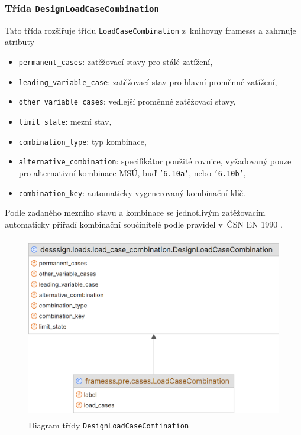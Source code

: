 \subsubsection*{Třída \texttt{DesignLoadCaseCombination}}
Tato třída rozšiřuje třídu \texttt{LoadCaseCombination} z~knihovny framesss a zahrnuje atributy
\begin{itemize}
    \item \texttt{permanent\_cases}: zatěžovací stavy pro stálé zatížení,
    \item \texttt{leading\_variable\_case}: zatěžovací stav pro hlavní proměnné zatížení,
    \item \texttt{other\_variable\_cases}: vedlejší proměnné zatěžovací stavy,
    \item \texttt{limit\_state}: mezní stav,
    \item \texttt{combination\_type}: typ kombinace,
    \item \texttt{alternative\_combination}: specifikátor použité rovnice, vyžadovaný pouze pro alternativní kombinace MSÚ, buď \texttt{'6.10a'}, nebo \texttt{'6.10b'}, 
    \item \texttt{combination\_key}: automaticky vygenerovaný kombinační klíč.
\end{itemize}

Podle zadaného mezního stavu a kombinace se jednotlivým zatěžovacím automaticky přiřadí kombinační součinitelé podle pravidel v~ČSN EN 1990 \cite{EN1990}.

\begin{figure}[H]
    \includegraphics[height=8cm]{assets/figures/desssign/load_combinations.png}
    \caption{Diagram třídy \texttt{DesignLoadCaseComtination}}
    \label{fig:class_design_load_case_combination}
\end{figure}

